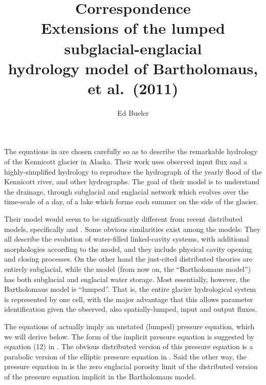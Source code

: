 \documentclass[twocolumn,letterpaper]{igs}
\begin{document}
\title{Correspondence \\ Extensions of the lumped subglacial-englacial \\ hydrology model of Bartholomaus, et al.~(2011)}

\author{Ed Bueler}


\maketitle

The equations in \cite{Bartholomausetal2011} are chosen carefully so as to describe the remarkable hydrology of the Kennicott glacier in Alaska.  Their work uses observed input flux and a highly-simplified hydrology to reproduce the hydrograph of the yearly flood of the Kennicott river, and other hydrographs.  The goal of their model is to understand the drainage, through subglacial and englacial network which evolves over the time-scale of a day, of a lake which forms each summer on the side of the glacier.

Their model would seem to be significantly different from recent distributed models, specifically \cite{Schoofetal2012} and \cite{Hewittetal2012}.  Some obvious similarities exist among the models: They all describe the evolution of water-filled linked-cavity systems, with additional morphologies according to the model, and they include physical cavity opening and closing processes.  On the other hand the just-cited distributed theories are entirely subglacial, while the \cite{Bartholomausetal2011} model (from now on, the ``Bartholomaus model'') has both subglacial and englacial water storage.  Most essentially, however, the Bartholomaus model is ``lumped''.  That is, the entire glacier hydrological system is represented by one cell, with the major advantage that this allows parameter identification given the observed, also spatially-lumped, input and output fluxes.

The equations of \cite{Bartholomausetal2011} actually imply an unstated (lumped) pressure equation, which we will derive below.  The form of the implicit pressure equation is suggested by equation (12) in \cite{Bartholomausetal2011}.  The obvious distributed version of this pressure equation is a parabolic version of the elliptic pressure equation in \cite{Schoofetal2012}.  Said the other way, the pressure equation in \cite{Schoofetal2012} is the zero englacial porosity limit of the distributed version of the pressure equation implicit in the Bartholomaus model.
\end{document}
